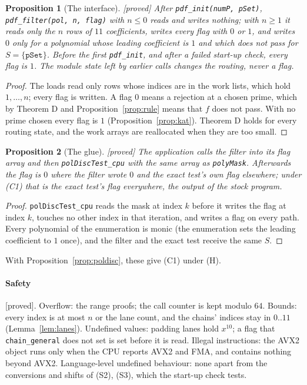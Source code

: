 \documentclass[10pt,a4paper]{article}
\newcommand{\code}[1]{\texttt{#1}}
\newcommand{\stproved}{\textsf{\small[proved]}\xspace}
\theoremstyle{plain}
\newtheorem{proposition}{Proposition}
\theoremstyle{definition}
\begin{document}
\begin{proposition}[The interface]\label{prop:contract}\stproved
After \code{pdf\_init(numP, pSet)}, \code{pdf\_filter(pol, n, flag)} with $n\le0$ reads and writes nothing; with $n\ge1$ it reads only the $n$ rows of $11$ coefficients,
writes every flag with $0$ or $1$, and writes $0$ only for a polynomial whose leading coefficient is $1$ and which does not pass for $S=\{\code{pSet}\}$.  Before the
first \code{pdf\_init}, and after a failed start-up check, every flag is $1$.  The module state left by earlier calls changes the routing, never a flag.
\end{proposition}
\begin{proof}
The loads read only rows whose indices are in the work lists, which hold $1,\dots,n$; every flag is written.  A flag $0$ means a rejection at a chosen prime, which by
Theorem D and Proposition~\ref{prop:rule} means that $f$ does not pass.  With no prime chosen every flag is $1$ (Proposition~\ref{prop:kat}).  Theorem D holds for
every routing state, and the work arrays are reallocated when they are too small.
\end{proof}

\begin{proposition}[The glue]\label{prop:glue}\stproved
The application calls the filter into its flag array and then \code{polDiscTest\_cpu} with the same array as \code{polyMask}.  Afterwards the flag is $0$ where the
filter wrote $0$ and the exact test's own flag elsewhere; under (C1) that is the exact test's flag everywhere, the output of the stock program.
\end{proposition}
\begin{proof}
\code{polDiscTest\_cpu} reads the mask at index $k$ before it writes the flag at index $k$, touches no other index in that iteration, and writes a flag on every path.
Every polynomial of the enumeration is monic (the enumeration sets the leading coefficient to $1$ once), and the filter and the exact test receive the same $S$.
\end{proof}

With Proposition~\ref{prop:poldisc}, these give (C1) under (H).

\paragraph{Safety} \stproved.  Overflow: the range proofs; the call counter is kept modulo $64$.  Bounds: every index is at most $n$ or the lane count, and the chains'
indices stay in $0..11$ (Lemma~\ref{lem:lanes}).  Undefined values: padding lanes hold $x^{10}$; a flag that \code{chain\_general} does not set is set before it is read.
Illegal instructions: the AVX2 object runs only when the CPU reports AVX2 and FMA, and contains nothing beyond AVX2.  Language-level undefined behaviour: none apart from
the conversions and shifts of (S2), (S3), which the start-up check tests.
\end{document}
